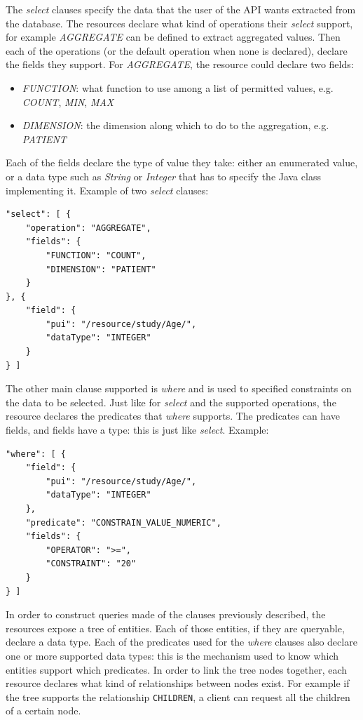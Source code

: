 The \emph{select} clauses specify the data that the user of the API wants extracted from the database.
The resources declare what kind of operations their \emph{select} support, for example \emph{AGGREGATE} can be defined to extract aggregated values.
Then each of the operations (or the default operation when none is declared), declare the fields they support.
For \emph{AGGREGATE}, the resource could declare two fields:
\begin{itemize}
    \item \emph{FUNCTION}: what function to use among a list of permitted values, e.g. \emph{COUNT}, \emph{MIN}, \emph{MAX}
    \item \emph{DIMENSION}: the dimension along which to do to the aggregation, e.g. \emph{PATIENT}
\end{itemize}
Each of the fields declare the type of value they take: either an enumerated value, or a data type such as \emph{String} or \emph{Integer} that has to specify the Java class implementing it.
Example of two \emph{select} clauses:
\begin{verbatim}
"select": [ {
    "operation": "AGGREGATE",
    "fields": {
        "FUNCTION": "COUNT",
        "DIMENSION": "PATIENT"
    }
}, {
    "field": {
        "pui": "/resource/study/Age/",
        "dataType": "INTEGER"
    }
} ]
\end{verbatim}

The other main clause supported is \emph{where} and is used to specified constraints on the data to be selected.
Just like for \emph{select} and the supported operations, the resource declares the predicates that \emph{where} supports.
The predicates can have fields, and fields have a type: this is just like \emph{select}. 
Example:
\begin{verbatim}
"where": [ {
    "field": {
        "pui": "/resource/study/Age/",
        "dataType": "INTEGER"
    },
    "predicate": "CONSTRAIN_VALUE_NUMERIC",
    "fields": {
        "OPERATOR": ">=",
        "CONSTRAINT": "20"
    }
} ]
\end{verbatim}

In order to construct queries made of the clauses previously described, the resources expose a tree of entities.
Each of those entities, if they are queryable, declare a data type.
Each of the predicates used for the \emph{where} clauses also declare one or more supported data types: this is the mechanism used to know which entities support which predicates.
In order to link the tree nodes together, each resource declares what kind of relationships between nodes exist.
For example if the tree supports the relationship \verb|CHILDREN|, a client can request all the children of a certain node. 

